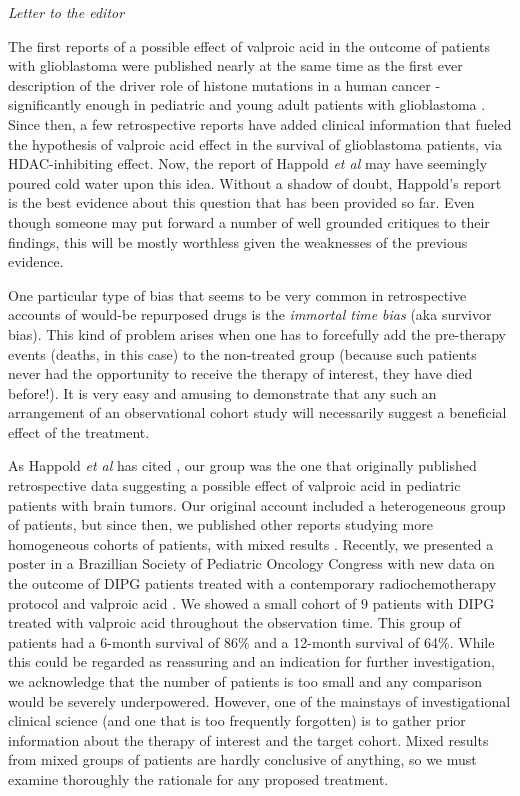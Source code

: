 \textit{Letter to the editor} 

The first reports \cite{Happold_2016} of a possible effect of valproic acid in the outcome of patients with glioblastoma were published nearly at the same time as the first ever description of the driver role of histone mutations in a human cancer - significantly enough in pediatric and young adult patients with glioblastoma \cite{Schwartzentruber_2012}. Since then, a few retrospective reports have added clinical information that fueled the hypothesis of valproic acid effect in the survival of glioblastoma patients, via HDAC-inhibiting effect. Now, the report of Happold \textit{et al} \cite{Happold_2016} may have seemingly poured cold water upon this idea. Without a shadow of doubt, Happold's report is the best evidence about this question that has been provided so far. Even though someone may put forward a number of well grounded critiques to their findings, this will be mostly worthless given the weaknesses of the previous evidence. 

One particular type of bias that seems to be very common in retrospective accounts of would-be repurposed drugs is the \textit{immortal time bias} \cite{Ho_2012} (aka survivor bias). This kind of problem arises when one has to forcefully add the pre-therapy events (deaths, in this case) to the non-treated group (because such patients never had the opportunity to receive the therapy of interest, they have died before!). It is very easy and amusing to demonstrate that any such an arrangement of an observational cohort study will necessarily suggest a beneficial effect of the treatment. 

As Happold \textit{et al} has cited \cite{Happold_2016}, our group was the one that originally published retrospective data suggesting a possible effect of valproic acid in pediatric patients with brain tumors. Our original account included a heterogeneous group of patients, but since then, we published other reports studying more homogeneous cohorts of patients, with mixed results \cite{Felix_2012}. Recently, we presented a poster in a Brazillian Society of Pediatric Oncology Congress with new data on the outcome of DIPG patients treated with a contemporary radiochemotherapy protocol and valproic acid \cite{59c42273-d778-4fe5-8019-07a0e4509517}. We showed a small cohort of 9 patients with DIPG treated with valproic acid throughout the observation time. This group of patients had a 6-month survival of 86\% and a 12-month survival of 64\%. While this could be regarded as reassuring and an indication for further investigation, we acknowledge that the number of patients is too small and any comparison would be severely underpowered. However, one of the mainstays of investigational clinical science (and one that is too frequently forgotten) is to gather prior information about the therapy of interest and the target cohort. Mixed results from mixed groups of patients are hardly conclusive of anything, so we must examine thoroughly the rationale for any proposed treatment. 

